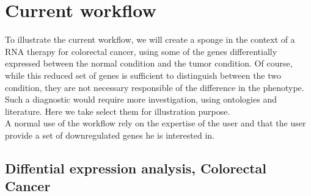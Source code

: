 \documentclass[a4paper,12pt]{report}
\begin{document}
\section{Current workflow}

To illustrate the current workflow, we will create a sponge in the context of a RNA therapy for colorectal cancer, using some of the genes differentially expressed between the normal condition and the tumor condition. Of course, while this reduced set of genes is sufficient to distinguish between the two condition, they are not necessary responsible of the difference in the phenotype. Such a diagnostic would require more investigation, using ontologies and literature. Here we take select them for illustration purpose.\\
A normal use of the workflow rely on the expertise of the user and that the user provide a set of downregulated genes he is interested in.\\

\subsection{Diffential expression analysis, Colorectal Cancer}
\end{document}

